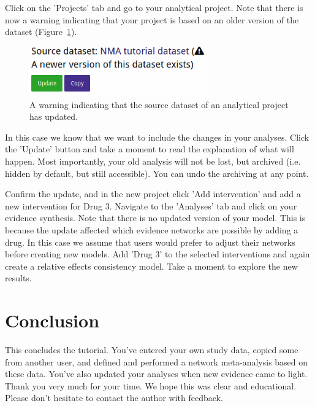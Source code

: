 \documentclass[12pt]{article}
\begin{document}
Click on the 'Projects' tab and go to your analytical project.
Note that there is now a warning indicating that your project is based on an older version of the dataset (Figure~\ref{fig:updateWarning}).

\begin{figure}[!ht]
  \centering
  \includegraphics[width=0.7\textwidth]{img/updateWarning.png}
  \caption{A warning indicating that the source dataset of an analytical project has updated.}
\label{fig:updateWarning}
\end{figure}

In this case we know that we want to include the changes in your analyses.
Click the 'Update' button and take a moment to read the explanation of what will happen.
Most importantly, your old analysis will not be lost, but archived (i.e. hidden by default, but still accessible).
You can undo the archiving at any point.

Confirm the update, and in the new project click 'Add intervention' and add a new intervention for Drug 3.
Navigate to the 'Analyses' tab and click on your evidence synthesis. 
Note that there is no updated version of your model.
This is because the update affected which evidence networks are possible by adding a drug.
In this case we assume that users would prefer to adjust their networks before creating new models.
Add 'Drug 3' to the selected interventions and again create a relative effects consistency model.
Take a moment to explore the new results.

\section{Conclusion}

This concludes the tutorial.
You've entered your own study data, copied some from another user, and defined and performed a network meta-analysis based on these data.
You've also updated your analyses when new evidence came to light.
Thank you very much for your time.
We hope this was clear and educational.
Please don't hesitate to contact the author with feedback.
\end{document}
